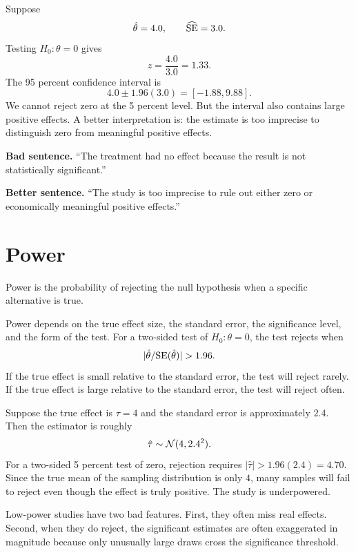 Suppose
\[
  \hat{\theta}=4.0,
  \qquad
  \widehat{\mathrm{SE}}=3.0.
\]
Testing $H_0:\theta=0$ gives
\[
  z=\frac{4.0}{3.0}=1.33.
\]
The 95 percent confidence interval is
\[
  4.0 \pm 1.96(3.0) = [-1.88,9.88].
\]
We cannot reject zero at the 5 percent level. But the interval also contains
large positive effects. A better interpretation is: the estimate is too
imprecise to distinguish zero from meaningful positive effects.

\begin{boxF}
\textbf{Bad sentence.} ``The treatment had no effect because the result is not
statistically significant.''

\textbf{Better sentence.} ``The study is too imprecise to rule out either zero
or economically meaningful positive effects.''
\end{boxF}

\section{Power}

\begin{defN}[Power]
Power is the probability of rejecting the null hypothesis when a specific
alternative is true.
\end{defN}

Power depends on the true effect size, the standard error, the significance
level, and the form of the test. For a two-sided test of $H_0:\theta=0$, the
test rejects when
\[
  |\hat{\theta}/\se(\hat{\theta})|>1.96.
\]
If the true effect is small relative to the standard error, the test will
reject rarely. If the true effect is large relative to the standard error, the
test will reject often.

\begin{exmp}
Suppose the true effect is $\tau=4$ and the standard error is approximately
$2.4$. Then the estimator is roughly
\[
  \hat{\tau}\sim \mathcal{N}(4,2.4^2).
\]
For a two-sided 5 percent test of zero, rejection requires
$|\hat{\tau}|>1.96(2.4)=4.70$. Since the true mean of the sampling distribution
is only $4$, many samples will fail to reject even though the effect is truly
positive. The study is underpowered.
\end{exmp}

Low-power studies have two bad features. First, they often miss real effects.
Second, when they do reject, the significant estimates are often exaggerated in
magnitude because only unusually large draws cross the significance threshold.

